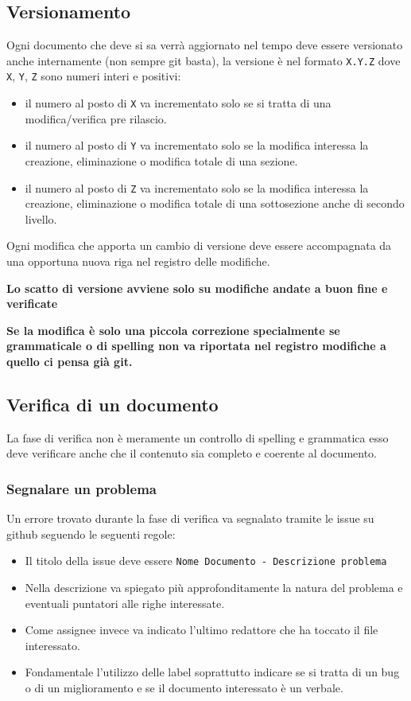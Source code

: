 \subsection{Versionamento}
Ogni documento che deve si sa verrà aggiornato nel tempo deve essere versionato anche
internamente (non sempre git basta), la versione è nel formato \texttt{X.Y.Z} dove
\texttt{X}, \texttt{Y}, \texttt{Z} sono numeri interi e positivi:
\begin{itemize}
    \item il numero al posto di \texttt{X} va incrementato solo se si tratta di una
    modifica/verifica pre rilascio.
    \item il numero al posto di \texttt{Y} va incrementato solo se la modifica
    interessa la creazione, eliminazione o modifica totale di una sezione.
    \item il numero al posto di \texttt{Z} va incrementato solo se la modifica
    interessa la creazione, eliminazione o modifica totale di una sottosezione
    anche di secondo livello.
\end{itemize}
Ogni modifica che apporta un cambio di versione deve essere accompagnata da una
opportuna nuova riga nel registro delle modifiche.

\textbf{Lo scatto di versione avviene solo su modifiche andate a buon fine e verificate}

\textbf{Se la modifica è solo una piccola correzione specialmente se grammaticale o di
spelling non va riportata nel registro modifiche a quello ci pensa già git.}


\subsection{Verifica di un documento}
La fase di verifica non è meramente un controllo di spelling e grammatica esso
deve verificare anche che il contenuto sia completo e coerente al documento.

\subsubsection{Segnalare un problema}
Un errore trovato durante la fase di verifica va segnalato tramite le issue su github
seguendo le seguenti regole:
\begin{itemize}
    \item Il titolo della issue deve essere
    \texttt{Nome Documento - Descrizione problema}
    \item Nella descrizione va spiegato più approfonditamente la natura del
    problema e eventuali puntatori alle righe interessate.
    \item  Come assignee invece va indicato l'ultimo redattore che ha toccato il file
    interessato.
    \item Fondamentale l'utilizzo delle label soprattutto indicare se si tratta
    di un bug o di un miglioramento e se il documento interessato è un verbale.
\end{itemize}

